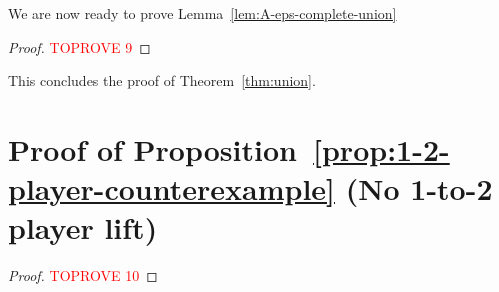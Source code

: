 \documentclass[a4paper,UKenglish,cleveref, thm-restate]{lipics-v2021}
\begin{document}
We are now ready to prove Lemma~\ref{lem:A-eps-complete-union}

\begin{proof}\textcolor{red}{TOPROVE 9}\end{proof}

This concludes the proof of Theorem~\ref{thm:union}. 
\section{Proof of Proposition~\ref{prop:1-2-player-counterexample} (No 1-to-2 player lift)}\label{app:no-lift}
\counterexampleLift*

\begin{proof}\textcolor{red}{TOPROVE 10}\end{proof} 
\end{document}
